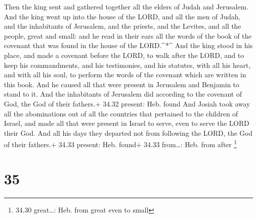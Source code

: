  Then the king sent and gathered together all the elders of
Judah and Jerusalem.  And the king went up into the house
of the LORD, and all the men of Judah, and the inhabitants of Jerusalem,
and the priests, and the Levites, and all the people, great and small:
and he read in their ears all the words of the book of the covenant that
was found in the house of the LORD.\^{}*\^{}  And the king
stood in his place, and made a covenant before the LORD, to walk after
the LORD, and to keep his commandments, and his testimonies, and his
statutes, with all his heart, and with all his soul, to perform the
words of the covenant which are written in this book.  And
he caused all that were present in Jerusalem and Benjamin to stand to
it. And the inhabitants of Jerusalem did according to the covenant of
God, the God of their fathers.+ 34.32 present: Heb. found 
And Josiah took away all the abominations out of all the countries that
pertained to the children of Israel, and made all that were present in
Israel to serve, even to serve the LORD their God. And all his days they
departed not from following the LORD, the God of their fathers.+ 34.33
present: Heb. found+ 34.33 from\ldots: Heb. from after \footnote{34.30
  great\ldots: Heb. from great even to small}

\hypertarget{section-34}{%
\section{35}\label{section-34}}

